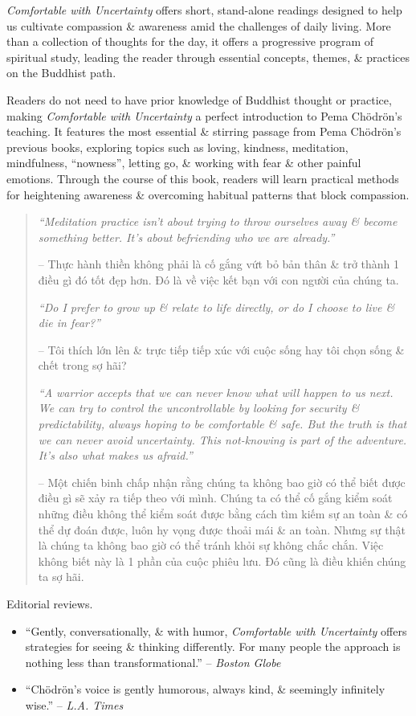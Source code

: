 \documentclass{article}
\begin{document}
\begin{enumerate}
	{\it Comfortable with Uncertainty} offers short, stand-alone readings designed to help us cultivate compassion \& awareness amid the challenges of daily living. More than a collection of thoughts for the day, it offers a progressive program of spiritual study, leading the reader through essential concepts, themes, \& practices on the Buddhist path.

	Readers do not need to have prior knowledge of Buddhist thought or practice, making {\it Comfortable with Uncertainty} a perfect introduction to {\sc Pema Ch\"odr\"on}'s teaching. It features the most essential \& stirring passage from {\sc Pema Ch\"odr\"on}'s previous books, exploring topics such as loving, kindness, meditation, mindfulness, ``nowness'', letting go, \& working with fear \& other painful emotions. Through the course of this book, readers will learn practical methods for heightening awareness \& overcoming habitual patterns that block compassion.

	\begin{quotation}
		{\it``Meditation practice isn't about trying to throw ourselves away \& become something better. It's about befriending who we are already.''}

		-- Thực hành thiền không phải là cố gắng vứt bỏ bản thân \& trở thành 1 điều gì đó tốt đẹp hơn. Đó là về việc kết bạn với con người của chúng ta.

		{\it``Do I prefer to grow up \& relate to life directly, or do I choose to live \& die in fear?''}

		-- Tôi thích lớn lên \& trực tiếp tiếp xúc với cuộc sống hay tôi chọn sống \& chết trong sợ hãi?

		{\it``A warrior accepts that we can never know what will happen to us next. We can try to control the uncontrollable by looking for security \& predictability, always hoping to be comfortable \& safe. But the truth is that we can never avoid uncertainty. This not-knowing is part of the adventure. It's also what makes us afraid.''}

		-- Một chiến binh chấp nhận rằng chúng ta không bao giờ có thể biết được điều gì sẽ xảy ra tiếp theo với mình. Chúng ta có thể cố gắng kiểm soát những điều không thể kiểm soát được bằng cách tìm kiếm sự an toàn \& có thể dự đoán được, luôn hy vọng được thoải mái \& an toàn. Nhưng sự thật là chúng ta không bao giờ có thể tránh khỏi sự không chắc chắn. Việc không biết này là 1 phần của cuộc phiêu lưu. Đó cũng là điều khiến chúng ta sợ hãi.
	\end{quotation}
	{\sf Editorial reviews.}
	\begin{itemize}
		\item ``Gently, conversationally, \& with humor, {\it Comfortable with Uncertainty} offers strategies for seeing \& thinking differently. For many people the approach is nothing less than transformational.'' -- {\it Boston Globe}
		\item ``{\sc Ch\"odr\"on}'s voice is gently humorous, always kind, \& seemingly infinitely wise.'' -- {\it L.A. Times}
	\end{itemize}


\end{enumerate}
\end{document}
